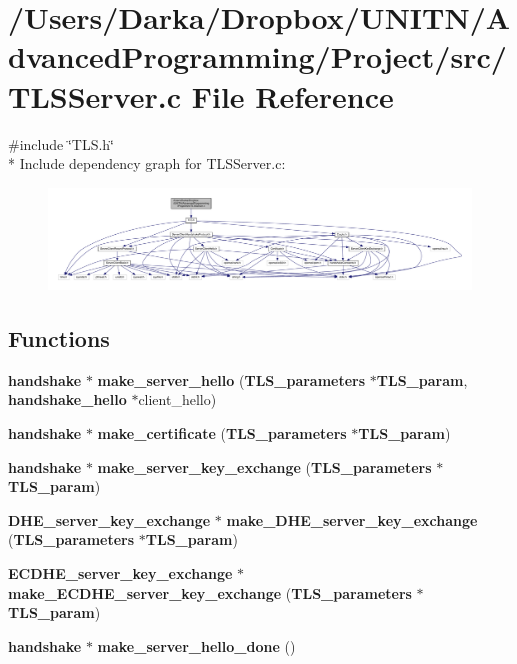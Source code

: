 \section{/\+Users/\+Darka/\+Dropbox/\+U\+N\+I\+T\+N/\+Advanced\+Programming/\+Project/src/\+T\+L\+S\+Server.c File Reference}
\label{_t_l_s_server_8c}
{\ttfamily \#include \char`\"{}T\+L\+S.\+h\char`\"{}}\\*
Include dependency graph for T\+L\+S\+Server.\+c\+:\nopagebreak
\begin{figure}[H]
\begin{center}
\leavevmode
\includegraphics[width=350pt]{_t_l_s_server_8c__incl}
\end{center}
\end{figure}
\subsection*{Functions}
\begin{DoxyCompactItemize}
\item 
{\bf handshake} $\ast$ {\bf make\+\_\+server\+\_\+hello} ({\bf T\+L\+S\+\_\+parameters} $\ast${\bf T\+L\+S\+\_\+param}, {\bf handshake\+\_\+hello} $\ast$client\+\_\+hello)
\item 
{\bf handshake} $\ast$ {\bf make\+\_\+certificate} ({\bf T\+L\+S\+\_\+parameters} $\ast${\bf T\+L\+S\+\_\+param})
\item 
{\bf handshake} $\ast$ {\bf make\+\_\+server\+\_\+key\+\_\+exchange} ({\bf T\+L\+S\+\_\+parameters} $\ast${\bf T\+L\+S\+\_\+param})
\item 
{\bf D\+H\+E\+\_\+server\+\_\+key\+\_\+exchange} $\ast$ {\bf make\+\_\+\+D\+H\+E\+\_\+server\+\_\+key\+\_\+exchange} ({\bf T\+L\+S\+\_\+parameters} $\ast${\bf T\+L\+S\+\_\+param})
\item 
{\bf E\+C\+D\+H\+E\+\_\+server\+\_\+key\+\_\+exchange} $\ast$ {\bf make\+\_\+\+E\+C\+D\+H\+E\+\_\+server\+\_\+key\+\_\+exchange} ({\bf T\+L\+S\+\_\+parameters} $\ast${\bf T\+L\+S\+\_\+param})
\item 
{\bf handshake} $\ast$ {\bf make\+\_\+server\+\_\+hello\+\_\+done} ()
\end{DoxyCompactItemize}


